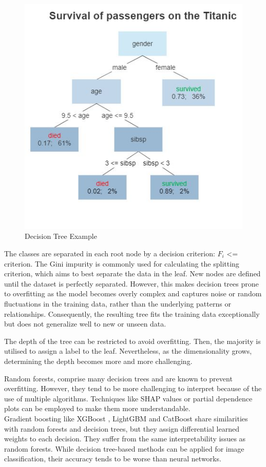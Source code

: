 \begin{figure}[H]
	\centering
	\includegraphics[width=150mm]{figs/decision_tree}
	\caption[Decision Tree Example]{Decision Tree Example} 
	\label{fig:Decision_tree}
\end{figure}

The classes are separated in each root node by a decision criterion: $F_i$ <= criterion. The Gini impurity is commonly used for calculating the splitting criterion, which aims to best separate the data in the leaf. New nodes are defined until the dataset is perfectly separated. However, this makes decision trees prone to overfitting as the model becomes overly complex and captures noise or random fluctuations in the training data, rather than the underlying patterns or relationships. Consequently, the resulting tree fits the training data exceptionally but does not generalize well to new or unseen data. 

The depth of the tree can be restricted to avoid overfitting. Then, the majority is utilised to assign a label to the leaf. Nevertheless, as the dimensionality grows, determining the depth becomes more and more challenging.

Random forests\cite{ho1995random}, comprise many decision trees and are known to prevent overfitting. However, they tend to be more challenging to interpret because of the use of multiple algorithms. Techniques like SHAP values \cite{lundberg2017unified} or partial dependence plots \cite{PDP} can be employed to make them more understandable.
\\
Gradient boosting like XGBoost \cite{Chen_2016}, LightGBM \cite{Ke2017} and CatBoost \cite{prokhorenkova2019catboost} share similarities with random forests and decision trees, but they assign differential learned weights to each decision. They suffer from the same interpretability issues as random forests. While decision tree-based methods can be applied for image classification, their accuracy tends to be worse than neural networks.


